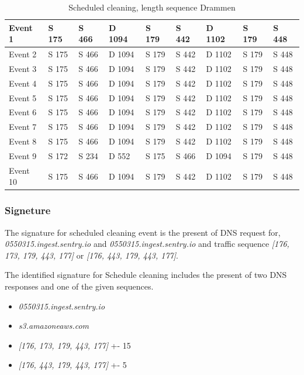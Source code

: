 \begin{table}[H]
\centering
\caption{ Scheduled cleaning, length sequence Drammen}
\label{tab:SCsequenceDrammen}
\begin{tabular}{|l|l|l|l|l|l|l|l|l|}
\hline
Event 1  & S 175   & S 466 & D 1094 & S 179 & S 442 & D 1102 & S 179 & S 448 \\ \hline
Event 2  & S 175   & S 466 & D 1094 & S 179 & S 442 & D 1102 & S 179 & S 448 \\ \hline
Event 3  & S 175   & S 466 & D 1094 & S 179 & S 442 & D 1102 & S 179 & S 448 \\ \hline
Event 4  & S 175   & S 466 & D 1094 & S 179 & S 442 & D 1102 & S 179 & S 448 \\ \hline
Event 5  & S 175   & S 466 & D 1094 & S 179 & S 442 & D 1102 & S 179 & S 448 \\ \hline
Event 6  & S 175   & S 466 & D 1094 & S 179 & S 442 & D 1102 & S 179 & S 448 \\ \hline
Event 7  & S 175   & S 466 & D 1094 & S 179 & S 442 & D 1102 & S 179 & S 448 \\ \hline
Event 8  & S 175   & S 466 & D 1094 & S 179 & S 442 & D 1102 & S 179 & S 448 \\ \hline
Event 9  & S 172   & S 234 & D 552  & S 175 & S 466 & D 1094 & S 179 & S 448 \\ \hline
Event 10 & S 175   & S 466 & D 1094 & S 179 & S 442 & D 1102 & S 179 & S 448 \\ \hline
\end{tabular}
\end{table}

\subsubsection{Signeture}
The signature for scheduled cleaning event is the present of DNS request for, \textit{0550315.ingest.sentry.io} and \textit{0550315.ingest.sentry.io} and traffic sequence \textit{[176, 173, 179, 443, 177]} or \textit{[176, 443, 179, 443, 177]}.

The identified signature for Schedule cleaning includes the present of two DNS responses and one of the given sequences.  

\begin{itemize}
    \item \textit{0550315.ingest.sentry.io}
    \item \textit{s3.amazoneaws.com}
    \item \textit{[176, 173, 179, 443, 177]} +- 15
    \item \textit{[176, 443, 179, 443, 177]} +- 5
\end{itemize}



